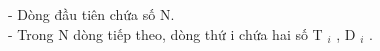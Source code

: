 - Dòng đầu tiên chứa số N.   
\\   - Trong N dòng tiếp theo, dòng thứ i chứa hai số T   $_    i   $   , D   $_    i   $   .